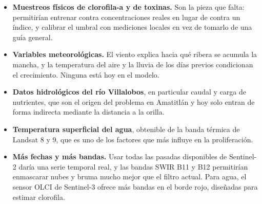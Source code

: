\documentclass[10pt,a4paper]{article}
\begin{document}
\begin{itemize}
  \item \textbf{Muestreos físicos de clorofila-a y de toxinas.} Son la pieza que falta: permitirían entrenar contra
  concentraciones reales en lugar de contra un índice, y calibrar el umbral con mediciones locales en vez de tomarlo
  de una guía general.
  \item \textbf{Variables meteorológicas.} El viento explica hacia qué ribera se acumula la mancha, y la
  temperatura del aire y la lluvia de los días previos condicionan el crecimiento. Ninguna está hoy en el modelo.
  \item \textbf{Datos hidrológicos del río Villalobos}, en particular caudal y carga de nutrientes, que son el
  origen del problema en Amatitlán y hoy solo entran de forma indirecta mediante la distancia a la orilla.
  \item \textbf{Temperatura superficial del agua}, obtenible de la banda térmica de Landsat 8 y 9, que es uno de los
  factores que más influye en la proliferación.
  \item \textbf{Más fechas y más bandas.} Usar todas las pasadas disponibles de Sentinel-2 daría una serie temporal
  real, y las bandas SWIR B11 y B12 permitirían enmascarar nubes y bruma mucho mejor que el filtro actual. Para
  agua, el sensor OLCI de Sentinel-3 ofrece más bandas en el borde rojo, diseñadas para estimar clorofila.
\end{itemize}
\end{document}
